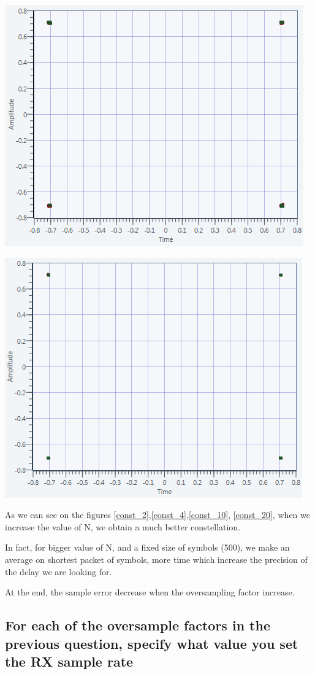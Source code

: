 \documentclass[frenchb, oneside, headings=normal]{scrartcl}
\begin{document}
\begin{center}
\includegraphics[width=.7\textwidth]{img/ConstellationN10-MaxEnergy}
\label{const_10}
\end{center}

\begin{center}
\includegraphics[width=.7\textwidth]{img/ConstellationN20-MaxEnergy}
\label{const_20}
\end{center}

As we can see on the figures \ref{const_2},\ref{const_4},\ref{const_10}, \ref{const_20}, when we increase the value of N, we obtain a much better constellation.

In fact, for bigger value of N, and a fixed size of symbols (500), we make an average on shortest packet of symbols, more time which increase the precision of the delay we are looking for.

At the end, the sample error decrease when the oversampling factor increase.

\subsection{For each of the oversample factors in the previous question, specify what value you set the RX sample rate}
\end{document}
